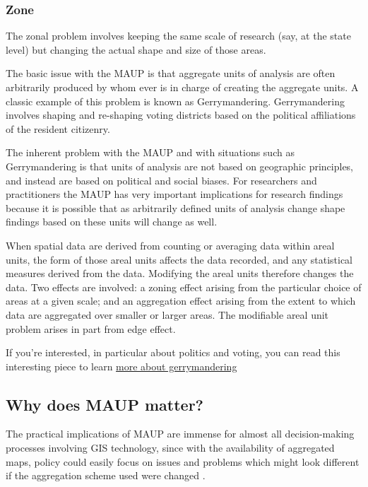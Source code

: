 \documentclass[
]{book}
\begin{document}
\hypertarget{zone}{%
\subsubsection{Zone}\label{zone}}

The zonal problem involves keeping the same scale of research (say, at the state level) but changing the actual shape and size of those areas.

The basic issue with the MAUP is that aggregate units of analysis are often arbitrarily produced by whom ever is in charge of creating the aggregate units. A classic example of this problem is known as Gerrymandering. Gerrymandering involves shaping and re-shaping voting districts based on the political affiliations of the resident citizenry.

The inherent problem with the MAUP and with situations such as Gerrymandering is that units of analysis are not based on geographic principles, and instead are based on political and social biases. For researchers and practitioners the MAUP has very important implications for research findings because it is possible that as arbitrarily defined units of analysis change shape findings based on these units will change as well.

When spatial data are derived from counting or averaging data within areal units, the form of those areal units affects the data recorded, and any statistical measures derived from the data. Modifying the areal units therefore changes the data. Two effects are involved: a zoning effect arising from the particular choice of areas at a given scale; and an aggregation effect arising from the extent to which data are aggregated over smaller or larger areas. The modifiable areal unit problem arises in part from edge effect.

If you're interested, in particular about politics and voting, you can read this interesting piece to learn \href{https://projects.fivethirtyeight.com/redistricting-maps/}{more about gerrymandering}

\hypertarget{why-does-maup-matter}{%
\subsection{Why does MAUP matter?}\label{why-does-maup-matter}}

The practical implications of MAUP are immense for almost all decision-making processes involving GIS technology, since with the availability of aggregated maps, policy could easily focus on issues and problems which might look different if the aggregation scheme used were changed .
\end{document}
